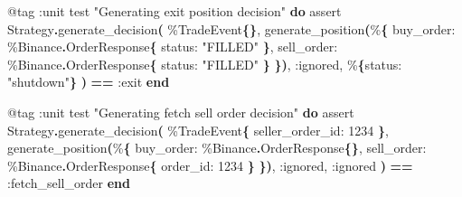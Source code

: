 \documentclass[
  oneside]{book}
\newenvironment{Shaded}{\begin{snugshade}}{\end{snugshade}}
\newcommand{\ConstantTok}[1]{\textcolor[rgb]{0.56,0.35,0.01}{#1}}
\newcommand{\DecValTok}[1]{\textcolor[rgb]{0.00,0.00,0.81}{#1}}
\newcommand{\FunctionTok}[1]{\textcolor[rgb]{0.13,0.29,0.53}{\textbf{#1}}}
\newcommand{\KeywordTok}[1]{\textcolor[rgb]{0.13,0.29,0.53}{\textbf{#1}}}
\newcommand{\NormalTok}[1]{#1}
\newcommand{\OperatorTok}[1]{\textcolor[rgb]{0.81,0.36,0.00}{\textbf{#1}}}
\newcommand{\OtherTok}[1]{\textcolor[rgb]{0.56,0.35,0.01}{#1}}
\newcommand{\StringTok}[1]{\textcolor[rgb]{0.31,0.60,0.02}{#1}}
\newcommand{\VariableTok}[1]{\textcolor[rgb]{0.00,0.00,0.00}{#1}}
\begin{document}
\begin{Shaded}
\begin{Highlighting}[]
  \OtherTok{@tag} \VariableTok{:unit}
\NormalTok{  test }\StringTok{"Generating exit position decision"} \KeywordTok{do}
\NormalTok{    assert }\ConstantTok{Strategy}\OperatorTok{.}\NormalTok{generate\_decision}\FunctionTok{(}
\NormalTok{             \%}\ConstantTok{TradeEvent}\FunctionTok{\{\}}\NormalTok{,}
\NormalTok{             generate\_position}\FunctionTok{(}\NormalTok{\%}\FunctionTok{\{}
               \VariableTok{buy\_order:}\NormalTok{ \%}\ConstantTok{Binance}\OperatorTok{.}\ConstantTok{OrderResponse}\FunctionTok{\{}
                 \VariableTok{status:} \StringTok{"FILLED"}
               \FunctionTok{\}}\NormalTok{,}
               \VariableTok{sell\_order:}\NormalTok{ \%}\ConstantTok{Binance}\OperatorTok{.}\ConstantTok{OrderResponse}\FunctionTok{\{}
                 \VariableTok{status:} \StringTok{"FILLED"}
               \FunctionTok{\}}
             \FunctionTok{\})}\NormalTok{,}
             \VariableTok{:ignored}\NormalTok{,}
\NormalTok{             \%}\FunctionTok{\{}\VariableTok{status:} \StringTok{"shutdown"}\FunctionTok{\}}
           \FunctionTok{)} \OperatorTok{==} \VariableTok{:exit}
  \KeywordTok{end}

  \OtherTok{@tag} \VariableTok{:unit}
\NormalTok{  test }\StringTok{"Generating fetch sell order decision"} \KeywordTok{do}
\NormalTok{    assert }\ConstantTok{Strategy}\OperatorTok{.}\NormalTok{generate\_decision}\FunctionTok{(}
\NormalTok{             \%}\ConstantTok{TradeEvent}\FunctionTok{\{}
               \VariableTok{seller\_order\_id:} \DecValTok{1234}
             \FunctionTok{\}}\NormalTok{,}
\NormalTok{             generate\_position}\FunctionTok{(}\NormalTok{\%}\FunctionTok{\{}
               \VariableTok{buy\_order:}\NormalTok{ \%}\ConstantTok{Binance}\OperatorTok{.}\ConstantTok{OrderResponse}\FunctionTok{\{\}}\NormalTok{,}
               \VariableTok{sell\_order:}\NormalTok{ \%}\ConstantTok{Binance}\OperatorTok{.}\ConstantTok{OrderResponse}\FunctionTok{\{}
                 \VariableTok{order\_id:} \DecValTok{1234}
               \FunctionTok{\}}
             \FunctionTok{\})}\NormalTok{,}
             \VariableTok{:ignored}\NormalTok{,}
             \VariableTok{:ignored}
           \FunctionTok{)} \OperatorTok{==} \VariableTok{:fetch\_sell\_order}
  \KeywordTok{end}


\end{Highlighting}
\end{Shaded}
\end{document}
